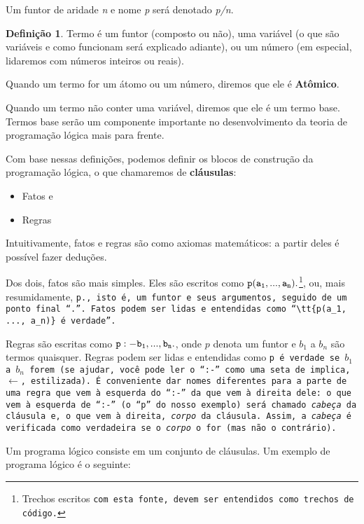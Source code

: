 \documentclass{article}
\theoremstyle{definition}
\newtheorem{definition}{Definição}[section]
\theoremstyle{remark}
\begin{document}
    Um funtor de aridade \textit{n} e nome \textit{p} será denotado \textit{p/n}.



  \theoremstyle{definition}
  \begin{definition}{Termo}
     é um funtor (composto ou não), uma variável (o que são variáveis e como funcionam será explicado adiante), ou um número (em especial, lidaremos com números inteiros ou reais).
  \end{definition}

  Quando um termo for um átomo ou um número, diremos que ele é \textbf{Atômico}.

Quando um termo não conter uma variável, diremos que ele é um termo base.
Termos base serão um componente importante no desenvolvimento da teoria de programação lógica mais para frente.

Com base nessas definições, podemos definir os blocos de construção da programação lógica, o que chamaremos de \textbf{cláusulas}:
\begin{itemize}
  \item Fatos e
  \item Regras
\end{itemize}

Intuitivamente, fatos e regras são como axiomas matemáticos: a partir deles é possível fazer deduções.

Dos dois, fatos são mais simples. Eles são escritos como  $\tt{p(a_1, ..., a_n).}$\footnote{Trechos escritos \tt{com esta fonte}, devem ser entendidos como trechos de código.},  ou, mais resumidamente, \tt{p.}, isto é, um funtor e seus argumentos, seguido de um ponto final ``.''. Fatos podem ser lidas e entendidas como ``$\tt{p(a_1, ..., a_n)}$ é verdade''.

Regras são escritas como $\tt{p :- b_1, ..., b_n.}$, onde $p$ denota um funtor e $b_1$ a $b_n$ são termos quaisquer. Regras podem ser lidas e entendidas como \tt{p é verdade se $b_1$ a $b_n$ forem} (se ajudar, você pode ler o ``:-'' como uma seta de implica, $\leftarrow$, estilizada). É conveniente dar nomes diferentes para a parte de uma regra que vem à esquerda do ``:-'' da que vem à direita dele: o que vem à esquerda de ``:-'' (o ``p'' do nosso exemplo) será chamado \textit{cabeça} da cláusula e, o que vem à direita, \textit{corpo} da cláusula. Assim, a
\textit{cabeça} é verificada como verdadeira se o \textit{corpo} o for (mas não o contrário).

Um programa lógico consiste em um conjunto de cláusulas. Um exemplo de programa lógico é o seguinte:\\
\end{document}
